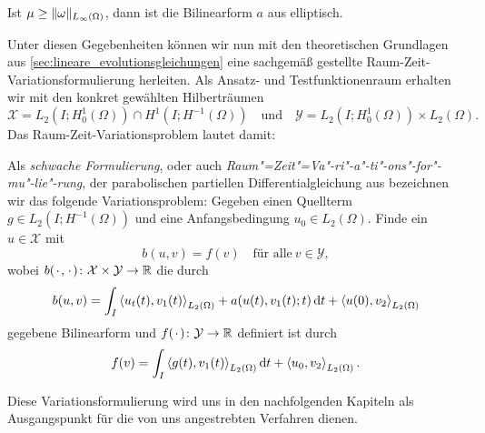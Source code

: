\begin{Korollar}
    Ist $\mu \geq \lVert\omega\rVert_{L_{\infty}(\Omega)}$, dann ist die Bilinearform $a$ aus  elliptisch.
\end{Korollar}

Unter diesen Gegebenheiten können wir nun mit den theoretischen Grundlagen aus \autoref{sec:lineare_evolutionsgleichungen} eine sachgemäß gestellte Raum-Zeit-Variationsformulierung herleiten.
Als Ansatz- und Testfunktionenraum erhalten wir mit den konkret gewählten Hilberträumen
\begin{equation}
    \label{eq:var_ansatzraum_testraum}
    \mathcal X = L_{2}(I; H^{1}_{0}(\Omega)) \cap H^{1}(I; H^{-1}(\Omega))
    \quad \text{und} \quad
    \mathcal Y = L_{2}(I; H^{1}_{0}(\Omega)) \times L_{2}(\Omega).
\end{equation}
Das Raum-Zeit-Variationsproblem lautet damit:
\begin{Definition}
\label{definition:cha3:schwache_formulierung}
    Als \emph{schwache Formulierung}, oder auch \emph{Raum"=Zeit"=Va"-ri"-a"-ti"-ons"-for"-mu"-lie"-rung}, der parabolischen partiellen Differentialgleichung aus  bezeichnen wir das folgende Variationsproblem:
    Gegeben einen Quellterm $g \in L_{2}(I; H^{-1}(\Omega))$ und eine Anfangsbedingung $u_{0} \in L_{2}(\Omega)$.
    Finde ein $u \in \mathcal X$ mit
    \begin{equation}
        \label{eq:varprob}
        b(u, v) = f(v) \quad \text{für alle}~v \in \mathcal Y,
    \end{equation}
    wobei $b({\mkern2mu\cdot\mkern2mu}, {\mkern2mu\cdot\mkern2mu}) \colon \mathcal X \times \mathcal Y \to \mathbb{R}$ die durch
    \begin{equation}
        \label{eq:buv}
        b(u, v)
            = \int_{I} \left\langle u_{t}(t),v_{1}(t)\right\rangle_{L_{2}(\Omega)} + a(u(t), v_{1}(t); t) \mathop{}\!\mathrm{d} t + \left\langle u(0),v_{2}\right\rangle_{L_{2}(\Omega)}
    \end{equation}
    gegebene Bilinearform und $f({\mkern2mu\cdot\mkern2mu}) \colon \mathcal Y \to \mathbb{R}$ definiert ist durch
    \begin{equation}
        \label{eq:var_all_f_wiederholung}
        f(v) = \int_{I} \left\langle g(t),v_{1}(t)\right\rangle_{L_{2}(\Omega)} \mathop{}\!\mathrm{d} t + \left\langle u_{0},v_{2}\right\rangle_{L_{2}(\Omega)}.
    \end{equation}
\end{Definition}

Diese Variationsformulierung wird uns in den nachfolgenden Kapiteln als Ausgangspunkt für die von uns angestrebten Verfahren dienen.

